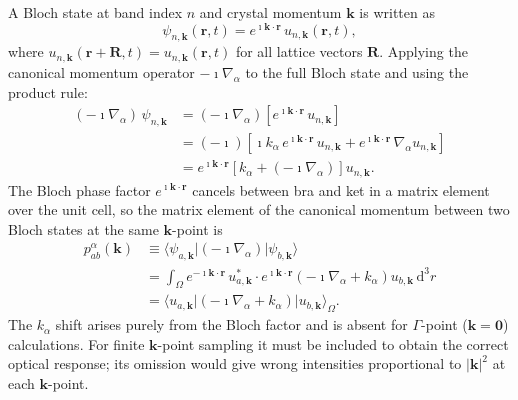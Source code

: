 A Bloch state at band index $n$ and crystal momentum $\mathbf{k}$
is written as
\begin{equation}
  \psi_{n,\mathbf{k}}(\mathbf{r},t)
  = e^{\imath\mathbf{k}\cdot\mathbf{r}}\,
    u_{n,\mathbf{k}}(\mathbf{r},t),
  \label{eq:bloch-def}
\end{equation}
where $u_{n,\mathbf{k}}(\mathbf{r}+\mathbf{R},t)
= u_{n,\mathbf{k}}(\mathbf{r},t)$ for all lattice vectors
$\mathbf{R}$.
Applying the canonical momentum operator $-\imath\nabla_\alpha$ to
the full Bloch state and using the product rule:
\begin{align}
  (-\imath\nabla_\alpha)\,\psi_{n,\mathbf{k}}
  &= (-\imath\nabla_\alpha)\!\left[
     e^{\imath\mathbf{k}\cdot\mathbf{r}}\,u_{n,\mathbf{k}}
     \right]
  \nonumber \\
  &= (-\imath)\!\left[
     \imath k_\alpha\,
     e^{\imath\mathbf{k}\cdot\mathbf{r}}\,u_{n,\mathbf{k}}
     + e^{\imath\mathbf{k}\cdot\mathbf{r}}\,
       \nabla_\alpha u_{n,\mathbf{k}}
     \right]
  \nonumber \\
  &= e^{\imath\mathbf{k}\cdot\mathbf{r}}
     \!\left[k_\alpha + (-\imath\nabla_\alpha)\right]
     u_{n,\mathbf{k}}.
  \label{eq:nabla-bloch}
\end{align}
The Bloch phase factor $e^{\imath\mathbf{k}\cdot\mathbf{r}}$
cancels between bra and ket in a matrix element over the unit cell,
so the matrix element of the canonical momentum between two Bloch
states at the same $\mathbf{k}$-point is
\begin{align}
  p^\alpha_{ab}(\mathbf{k})
  &\equiv \langle\psi_{a,\mathbf{k}}|(-\imath\nabla_\alpha)|
    \psi_{b,\mathbf{k}}\rangle
  \nonumber \\
  &= \int_\Omega\!
     e^{-\imath\mathbf{k}\cdot\mathbf{r}}\,u_{a,\mathbf{k}}^*\cdot
     e^{\imath\mathbf{k}\cdot\mathbf{r}}
     \!\left(-\imath\nabla_\alpha + k_\alpha\right)
     u_{b,\mathbf{k}}\,\mathrm{d}^3r
  \nonumber \\
  &= \langle u_{a,\mathbf{k}}|
     \!\left(-\imath\nabla_\alpha + k_\alpha\right)
     |u_{b,\mathbf{k}}\rangle_\Omega.
  \label{eq:para-bloch-me}
\end{align}
The $k_\alpha$ shift arises purely from the Bloch factor and is
absent for $\Gamma$-point ($\mathbf{k} = \mathbf{0}$) calculations.
For finite $\mathbf{k}$-point sampling it must be included to obtain
the correct optical response; its omission would give wrong
intensities proportional to $|\mathbf{k}|^2$ at each $\mathbf{k}$-point.


